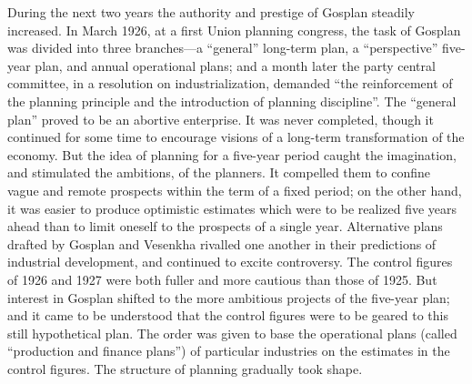 During the next two years the authority and prestige of Gosplan steadily increased. In March 1926, at a first Union planning congress, the task of Gosplan was divided into three branches---a ``general'' long-term plan, a ``perspective'' five-year plan, and annual operational plans; and a month later the party central committee, in a resolution on industrialization, demanded ``the reinforcement of the planning principle and the introduction of planning discipline''. The ``general plan'' proved to be an abortive enterprise. It was never completed, though it continued for some time to encourage visions of a long-term transformation of the economy. But the idea of planning for a five-year period caught the imagination, and stimulated the ambitions, of the planners. It compelled them to confine vague and remote prospects within the term of a fixed period; on the other hand, it was easier to produce optimistic estimates which were to be realized five years ahead than to limit oneself to the prospects of a single year. Alternative plans drafted by Gosplan and Vesenkha rivalled one another in their predictions of industrial development, and continued to excite controversy. The control figures of 1926 and 1927 were both fuller and more cautious than those of 1925. But interest in Gosplan shifted to the more ambitious projects of the five-year plan; and it came to be understood that the control figures were to be geared to this still hypothetical plan. The order was given to base the operational plans (called ``production and finance plans'') of particular industries on the estimates in the control figures. The structure of planning gradually took shape. 

